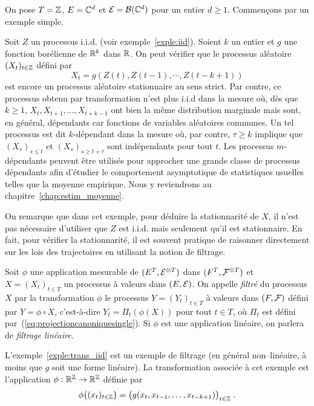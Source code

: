 On pose $T=\mathbb{Z}$, $E=\mathbb{C}^d$ et $\mathcal{E}=\mathcal{B}(\mathbb{C}^d)$ pour un entier
$d\geq1$. Commen\c{c}ons par un exemple simple.


\begin{example}
\label{exple:trans_iid}
Soit $Z$ un processus i.i.d. (voir exemple~\ref{exple:iid}).
Soient $k$ un entier et $g$ une fonction bor\'elienne de $\mathbb{R}^k$
dans $\mathbb{R}$. On peut v\'erifier que le processus al\'eatoire
$(X_t)_{t\in\mathbb{Z}}$ d\'efini par
\[
 X_t= g(Z(t), Z(t-1), \cdots, Z(t-k+1))
\]
est encore un processus al\'eatoire stationnaire au sens strict.  Par contre, ce
processus obtenu par transformation n'est plus i.i.d dans la mesure o\`u, d\`es que
$k \geq 1$, $X_t, X_{t+1}, \dots, X_{t+k-1}$ ont bien la m\^{e}me distribution
marginale mais sont, en g\'en\'eral, d\'ependants car fonctions de variables
al\'eatoires communes. Un tel processus est dit $k$-d\'ependant dans la mesure o\`u,
par contre, $\tau \geq k$ implique que $(X_s)_{s\leq t}$ et $(X_s)_{s\geq
  t+\tau}$ sont ind\'ependants pour tout $t$. Les processus $m$-d\'ependants
peuvent \^{e}tre utilis\'es pour approcher une grande classe de processus d\'ependants
afin d'\'etudier le comportement asymptotique de statistiques usuelles telles que
la moyenne empirique.  
Nous y reviendrons au chapitre~\ref{chap:estim_moyenne}.
\end{example}

On remarque que dans cet exemple, pour d\'eduire la stationnarit\'e de $X$, il
n'est pas n\'ecessaire d'utiliser que $Z$ est i.i.d. mais seulement qu'il est
stationnaire. En fait, pour v\'erifier la stationnarit\'e, il est souvent pratique
de raisonner directement sur les lois des trajectoires en utilisant la notion
de filtrage.

\begin{definition}
  Soit $\phi$ une application mesurable de $(E^T,\mathcal{E}^{\otimes T})$
  dans $(F^T,\mathcal{F}^{\otimes T})$ et $X=(X_t)_{t\in T}$ un processus \`a valeurs dans $(E,\mathcal{E})$.
  On appelle \emph{filtr\'e} du processus $X$ par la transformation $\phi$ le
  processus $Y=(Y_t)_{t\in T}$ \`a valeurs dans $(F,\mathcal{F})$ d\'efini par
  $Y=\phi\circ X$, c'est-\`a-dire $Y_t=\Pi_t(\phi( X))$ pour tout $t\in
  T$, o\`u $\Pi_t$ est d\'efini par~(\ref{eq:projectioncanoniquesingle}). Si
  $\phi$ est une application lin\'eaire, on parlera de \emph{filtrage lin\'eaire}.
\end{definition}

L'exemple~\ref{exple:trans_iid} est un exemple de filtrage (en g\'en\'eral
non--lin\'eaire, \`a moins que $g$ soit une forme lin\'eaire).  La transformation
associ\'ee \`a cet exemple est l'application $\phi:\mathbb{R}^{\mathbb{Z}}\to\mathbb{R}^{\mathbb{Z}}$
d\'efinie par
$$
\phi\big((x_t)_{t\in\mathbb{Z}}\big)=
\big(g(x_t,x_{t-1},\dots,x_{t-k+1})\big)_{t\in\mathbb{Z}}\;.
$$


